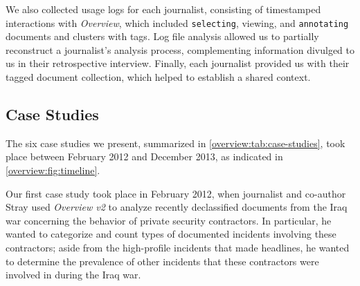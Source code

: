 We also collected usage logs for each journalist, consisting of timestamped interactions with {\it Overview}, which included {\tt selecting}, viewing, and {\tt annotating} documents and clusters with tags.
Log file analysis allowed us to partially reconstruct a journalist's analysis process, complementing information divulged to us in their retrospective interview.
Finally, each journalist provided us with their tagged document collection, which helped to establish a shared context.


\subsection{Case Studies}
\label{overview:case-studies}



The six case studies we present, summarized in \autoref{overview:tab:case-studies}, took place between February 2012 and December 2013, as indicated in \autoref{overview:fig:timeline}.

Our first case study took place in February 2012, when journalist and co-author Stray  used {\it Overview v2} to analyze recently declassified documents from the Iraq war concerning the behavior of private security contractors.
In particular, he wanted to categorize and count types of documented incidents involving these contractors; aside from the high-profile incidents that made headlines, he wanted to determine the prevalence of other incidents that these contractors were involved in during the Iraq war.

